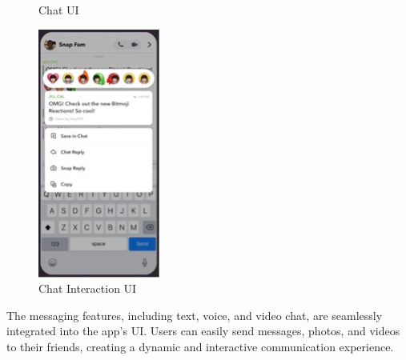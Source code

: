 \documentclass{article}
\begin{document}
\begin{figure}[h]
\begin{minipage}{0.15\textwidth}
        \caption{Chat UI}
        \label{fig:image2}
    \end{minipage}
    \begin{minipage}{0.15\textwidth} 
        \includegraphics[width=\linewidth]{chat.interaction.jpg} 
        \caption{Chat Interaction UI}
        \label{fig:image3}
    \end{minipage}
\end{figure}
The messaging features, including text, voice, and video chat, are seamlessly integrated into the app’s UI. Users can easily send messages, photos, and videos to their friends, creating a dynamic and interactive communication experience. \newline
\end{document}
